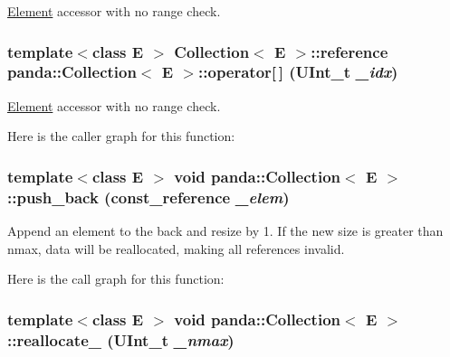 \hyperlink{classpanda_1_1Element}{Element} accessor with no range check. \hypertarget{classpanda_1_1Collection_a418aee57adfa79bf4db3ea1e7def58c4}{
\subsubsection[{operator[]}]{\setlength{\rightskip}{0pt plus 5cm}template$<$class E $>$ {\bf Collection}$<$ E $>$::{\bf reference} {\bf panda::Collection}$<$ E $>$::operator\mbox{[}$\,$\mbox{]} (UInt\_\-t {\em \_\-idx})}}
\label{classpanda_1_1Collection_a418aee57adfa79bf4db3ea1e7def58c4}


\hyperlink{classpanda_1_1Element}{Element} accessor with no range check. 

Here is the caller graph for this function:\hypertarget{classpanda_1_1Collection_a801b74a80bdd197bdfe08a06112bdcee}{
\subsubsection[{push\_\-back}]{\setlength{\rightskip}{0pt plus 5cm}template$<$class E $>$ void {\bf panda::Collection}$<$ E $>$::push\_\-back ({\bf const\_\-reference} {\em \_\-elem})}}
\label{classpanda_1_1Collection_a801b74a80bdd197bdfe08a06112bdcee}


Append an element to the back and resize by 1. If the new size is greater than nmax, data will be reallocated, making all references invalid. 

Here is the call graph for this function:\hypertarget{classpanda_1_1Collection_a2187bdc5efe30684f1e9f4db4fe4fb2e}{
\subsubsection[{reallocate\_\-}]{\setlength{\rightskip}{0pt plus 5cm}template$<$class E $>$ void {\bf panda::Collection}$<$ E $>$::reallocate\_\- (UInt\_\-t {\em \_\-nmax})}}
\label{classpanda_1_1Collection_a2187bdc5efe30684f1e9f4db4fe4fb2e}



